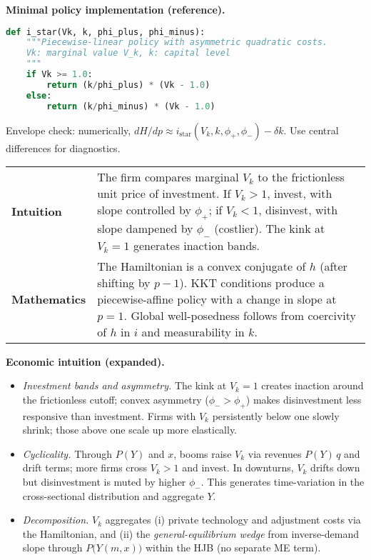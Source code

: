﻿\documentclass[11pt,letterpaper,oneside]{article}
\numberwithin{equation}{section}
\newcommand{\1}{\mathbf{1}}
\begin{document}
\begin{tcolorbox}[didacticstyle]
\textbf{Minimal policy implementation (reference).}
\begin{lstlisting}[language=Python]
def i_star(Vk, k, phi_plus, phi_minus):
    """Piecewise-linear policy with asymmetric quadratic costs.
    Vk: marginal value V_k, k: capital level
    """
    if Vk >= 1.0:
        return (k/phi_plus) * (Vk - 1.0)
    else:
        return (k/phi_minus) * (Vk - 1.0)
\end{lstlisting}
Envelope check: numerically, \(dH/dp \approx i_{\mathrm{star}}(V_k,k,\phi_+,\phi_-) - \delta k\). Use central differences for diagnostics.
\end{tcolorbox}

\begin{tcolorbox}[didacticstyle]
\sloppy
\begin{tabularx}{\textwidth}{@{}p{}X@{}}
\textbf{Intuition} & The firm compares marginal $V_k$ to the frictionless unit price of investment. If $V_k>1$, invest, with slope controlled by $\phi_+$; if $V_k<1$, disinvest, with slope dampened by $\phi_-$ (costlier). The kink at $V_k=1$ generates inaction bands.\\
\textbf{Mathematics} & The Hamiltonian is a convex conjugate of $h$ (after shifting by $p-1$). KKT conditions produce a piecewise-affine policy with a change in slope at $p=1$. Global well-posedness follows from coercivity of $h$ in $i$ and measurability in $k$.
\end{tabularx}
\end{tcolorbox}

\begin{tcolorbox}[didacticstyle]
\textbf{Economic intuition (expanded).}
\begin{itemize}[leftmargin=1.15em,itemsep=0.25em]
  \item \emph{Investment bands and asymmetry.} The kink at $V_k=1$ creates inaction around the frictionless cutoff; convex asymmetry ($\phi_->\phi_+$) makes disinvestment less responsive than investment. Firms with $V_k$ persistently below one slowly shrink; those above one scale up more elastically.
  \item \emph{Cyclicality.} Through $P(Y)$ and $x$, booms raise $V_k$ via revenues $P(Y)\,q$ and drift terms; more firms cross $V_k>1$ and invest. In downturns, $V_k$ drifts down but disinvestment is muted by higher $\phi_-$. This generates time-variation in the cross-sectional distribution and aggregate $Y$.
  \item \emph{Decomposition.} $V_k$ aggregates (i) private technology and adjustment costs via the Hamiltonian, and (ii) the \emph{general-equilibrium wedge} from inverse-demand slope through $P\big(Y(m,x)\big)$ within the HJB (no separate ME term).
\end{itemize}
\end{tcolorbox}
\end{document}

